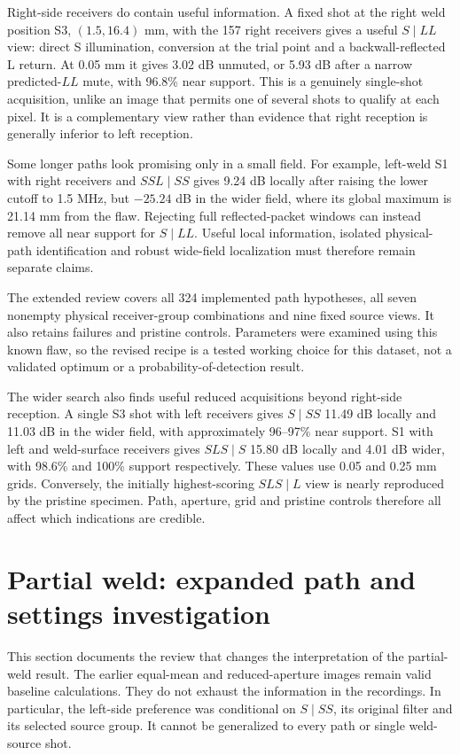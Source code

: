 Right-side receivers do contain useful information. A fixed shot at the right weld position S3, $(1.5,16.4)$ mm, with the 157 right receivers gives a useful $S\mid LL$ view: direct S illumination, conversion at the trial point and a backwall-reflected L return. At 0.05 mm it gives 3.02 dB unmuted, or 5.93 dB after a narrow predicted-$LL$ mute, with 96.8\% near support. This is a genuinely single-shot acquisition, unlike an image that permits one of several shots to qualify at each pixel. It is a complementary view rather than evidence that right reception is generally inferior to left reception.

Some longer paths look promising only in a small field. For example, left-weld S1 with right receivers and $SSL\mid SS$ gives 9.24 dB locally after raising the lower cutoff to 1.5 MHz, but $-25.24$ dB in the wider field, where its global maximum is 21.14 mm from the flaw. Rejecting full reflected-packet windows can instead remove all near support for $S\mid LL$. Useful local information, isolated physical-path identification and robust wide-field localization must therefore remain separate claims.

The extended review covers all 324 implemented path hypotheses, all seven nonempty physical receiver-group combinations and nine fixed source views. It also retains failures and pristine controls. Parameters were examined using this known flaw, so the revised recipe is a tested working choice for this dataset, not a validated optimum or a probability-of-detection result.

The wider search also finds useful reduced acquisitions beyond right-side reception. A single S3 shot with left receivers gives $S\mid SS$ 11.49 dB locally and 11.03 dB in the wider field, with approximately 96--97\% near support. S1 with left and weld-surface receivers gives $SLS\mid S$ 15.80 dB locally and 4.01 dB wider, with 98.6\% and 100\% support respectively. These values use 0.05 and 0.25 mm grids. Conversely, the initially highest-scoring $SLS\mid L$ view is nearly reproduced by the pristine specimen. Path, aperture, grid and pristine controls therefore all affect which indications are credible.


\section{Partial weld: expanded path and settings investigation}
\label{saftapp:expanded_review}
This section documents the review that changes the interpretation of the partial-weld result. The earlier equal-mean and reduced-aperture images remain valid baseline calculations. They do not exhaust the information in the recordings. In particular, the left-side preference was conditional on $S\mid SS$, its original filter and its selected source group. It cannot be generalized to every path or single weld-source shot.


